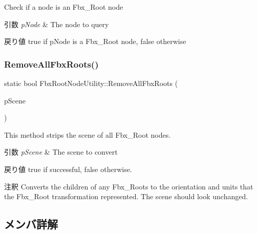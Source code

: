 Check if a node is an Fbx\+\_\+\+Root node 
\begin{DoxyParams}{引数}
{\em p\+Node} & The node to query \\
\hline
\end{DoxyParams}
\begin{DoxyReturn}{戻り値}
{\ttfamily true} if p\+Node is a Fbx\+\_\+\+Root node, false otherwise 
\end{DoxyReturn}
\mbox{\label{class_fbx_root_node_utility_ac4729d0953e660d3163f22ba02df5092}} 
\subsubsection{\texorpdfstring{Remove\+All\+Fbx\+Roots()}{RemoveAllFbxRoots()}}
{\footnotesize\ttfamily static bool Fbx\+Root\+Node\+Utility\+::\+Remove\+All\+Fbx\+Roots (\begin{DoxyParamCaption}\item[{\hyperlink{class_fbx_scene}{Fbx\+Scene} $\ast$}]{p\+Scene }\end{DoxyParamCaption})\hspace{0.3cm}{\ttfamily [static]}}

This method strips the scene of all Fbx\+\_\+\+Root nodes. 
\begin{DoxyParams}{引数}
{\em p\+Scene} & The scene to convert \\
\hline
\end{DoxyParams}
\begin{DoxyReturn}{戻り値}
{\ttfamily true} if successful, {\ttfamily false} otherwise. 
\end{DoxyReturn}
\begin{DoxyRemark}{注釈}
Converts the children of any Fbx\+\_\+\+Roots to the orientation and units that the Fbx\+\_\+\+Root transformation represented. The scene should look unchanged. 
\end{DoxyRemark}


\subsection{メンバ詳解}
\mbox{\label{class_fbx_root_node_utility_aa98b95d282380953bafc151c4100fe17}} 
